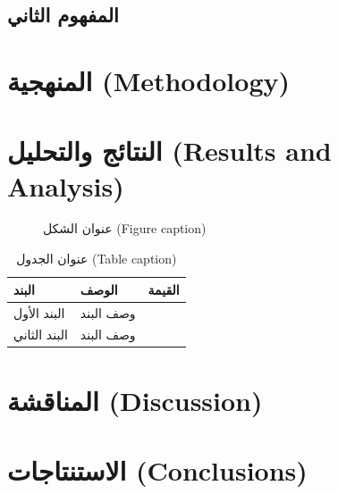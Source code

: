 \documentclass[11pt,a4paper]{article}
\begin{document}
\subsection{المفهوم الثاني}

\section{المنهجية (Methodology)}
\label{sec:method}


\section{النتائج والتحليل (Results and Analysis)}
\label{sec:results}


\begin{figure}[H]
\centering
\caption{عنوان الشكل (Figure caption)}
\end{figure}

\begin{table}[H]
\centering
\caption{عنوان الجدول (Table caption)}
\begin{tabularx}{\textwidth}{L{4cm} X C{3cm}}
\toprule
\textbf{البند} & \textbf{الوصف} & \textbf{القيمة} \\
\midrule
البند الأول & وصف البند &  \\
البند الثاني & وصف البند &  \\
\bottomrule
\end{tabularx}
\end{table}

\section{المناقشة (Discussion)}
\label{sec:discussion}


\section{الاستنتاجات (Conclusions)}
\label{sec:conclusion}




\end{document}
